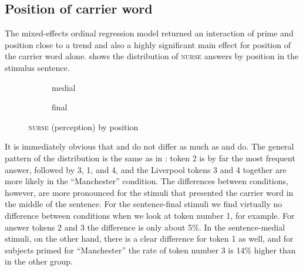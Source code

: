 \subsection{Position of carrier word}
\label{sec.perc_res.nurse.position}

The mixed-effects ordinal regression model returned an interaction of prime and position close to a trend and also a highly significant main effect for position of the carrier word alone.
 shows the distribution of \textsc{nurse} answers by position in the stimulus sentence.

\begin{figure}
	
	\begin{subfigure}{0.49\textwidth}
		
			\resizebox{\linewidth}{!}{} 
		\caption{medial}
		\label{fig.bar.nurse.tot.ext.med}
	\end{subfigure}
	\begin{subfigure}{0.49\textwidth}
		
			\resizebox{\linewidth}{!}{} 
		\caption{final}
		\label{fig.bar.nurse.tot.ext.fin}
	\end{subfigure}
	\caption{\textsc{nurse} (perception) by position}
	\label{fig.bar.nurse.tot.ext.pos}
\end{figure}

It is immediately obvious that  and  do not differ as much as  and  do.
The general pattern of the distribution is the same as in : token 2 is by far the most frequent answer, followed by 3, 1, and 4, and the Liverpool tokens 3 and 4 together are more likely in the ``Manchester'' condition.
The differences between  conditions, however, are more pronounced for the stimuli that presented the carrier word in the middle of the sentence.
For the sentence-final stimuli we find virtually no difference between  conditions when we look at token number 1, for example.
For answer tokens 2 and 3 the difference is only about 5\%.
In the sentence-medial stimuli, on the other hand, there is a clear difference for token 1 as well, and for subjects primed for ``Manchester'' the rate of token number 3 is 14\% higher than in the other group.

